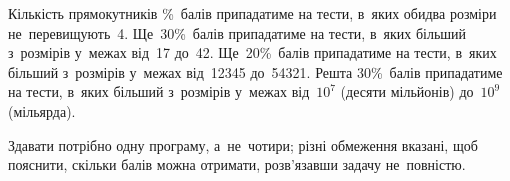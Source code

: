\begin{problemAllDefault}{Кількість прямокутників}
\%~балів припадатиме на тести, в~яких обидва розміри не~перевищують~4.
Ще~30\%~балів припадатиме на тести, в~яких більший з~розмірів у~межах від~17 до~42.
Ще~20\%~балів припадатиме на тести, в~яких більший з~розмірів у~межах від~12345 до~54321.
Решта 30\%~балів припадатиме на тести, в~яких більший з~розмірів у~межах від~$10^7$ (десяти мільйонів) до~$10^9$ (мільярда).

Здавати потрібно одну програму, а~не~чотири; різні обмеження вказані, щоб пояснити, 
скільки балів можна отримати, розв’язавши задачу не~повністю.


\end{problemAllDefault}
